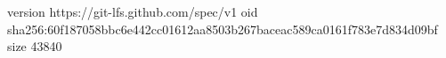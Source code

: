 version https://git-lfs.github.com/spec/v1
oid sha256:60f187058bbc6e442cc01612aa8503b267baceac589ca0161f783e7d834d09bf
size 43840

